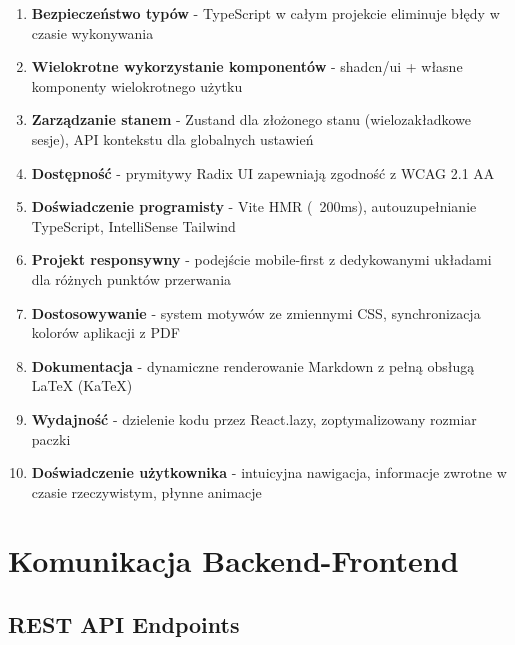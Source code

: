 \documentclass[12pt,a4paper]{article}
\begin{document}
\begin{tcolorbox}[colback=green!5!white,colframe=green!75!black,title=Kluczowe zalety architektury]
\begin{enumerate}
    \item \textbf{Bezpieczeństwo typów} - TypeScript w całym projekcie eliminuje błędy w czasie wykonywania
    \item \textbf{Wielokrotne wykorzystanie komponentów} - shadcn/ui + własne komponenty wielokrotnego użytku
    \item \textbf{Zarządzanie stanem} - Zustand dla złożonego stanu (wielozakładkowe sesje), API kontekstu dla globalnych ustawień
    \item \textbf{Dostępność} - prymitywy Radix UI zapewniają zgodność z WCAG 2.1 AA
    \item \textbf{Doświadczenie programisty} - Vite HMR (~200ms), autouzupełnianie TypeScript, IntelliSense Tailwind
    \item \textbf{Projekt responsywny} - podejście mobile-first z dedykowanymi układami dla różnych punktów przerwania
    \item \textbf{Dostosowywanie} - system motywów ze zmiennymi CSS, synchronizacja kolorów aplikacji z PDF
    \item \textbf{Dokumentacja} - dynamiczne renderowanie Markdown z pełną obsługą LaTeX (KaTeX)
    \item \textbf{Wydajność} - dzielenie kodu przez React.lazy, zoptymalizowany rozmiar paczki
    \item \textbf{Doświadczenie użytkownika} - intuicyjna nawigacja, informacje zwrotne w czasie rzeczywistym, płynne animacje
\end{enumerate}
\end{tcolorbox}

\section{Komunikacja Backend-Frontend}

\subsection{REST API Endpoints}
\end{document}
